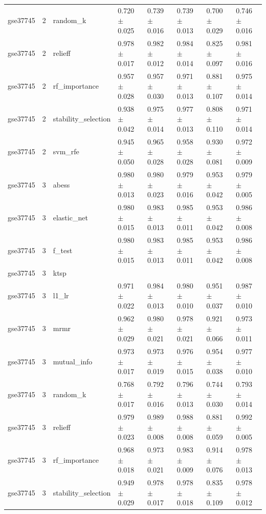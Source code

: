 \begin{table}[t]
\begin{tabular}{llllllll}
    gse37745 & 2 & random\_k & 0.720 $\pm$ 0.025 & 0.739 $\pm$ 0.016 & 0.739 $\pm$ 0.013 & 0.700 $\pm$ 0.029 & 0.746 $\pm$ 0.016 \\
    gse37745 & 2 & relieff & 0.978 $\pm$ 0.017 & 0.982 $\pm$ 0.012 & 0.984 $\pm$ 0.014 & 0.825 $\pm$ 0.097 & 0.981 $\pm$ 0.016 \\
    gse37745 & 2 & rf\_importance & 0.957 $\pm$ 0.028 & 0.957 $\pm$ 0.030 & 0.971 $\pm$ 0.013 & 0.881 $\pm$ 0.107 & 0.975 $\pm$ 0.014 \\
    gse37745 & 2 & stability\_selection & 0.938 $\pm$ 0.042 & 0.975 $\pm$ 0.014 & 0.977 $\pm$ 0.013 & 0.808 $\pm$ 0.110 & 0.971 $\pm$ 0.014 \\
    gse37745 & 2 & svm\_rfe & 0.945 $\pm$ 0.050 & 0.965 $\pm$ 0.028 & 0.958 $\pm$ 0.028 & 0.930 $\pm$ 0.081 & 0.972 $\pm$ 0.009 \\
    gse37745 & 3 & abess & 0.980 $\pm$ 0.013 & 0.980 $\pm$ 0.023 & 0.979 $\pm$ 0.016 & 0.953 $\pm$ 0.042 & 0.979 $\pm$ 0.005 \\
    gse37745 & 3 & elastic\_net & 0.980 $\pm$ 0.015 & 0.983 $\pm$ 0.013 & 0.985 $\pm$ 0.011 & 0.953 $\pm$ 0.042 & 0.986 $\pm$ 0.008 \\
    gse37745 & 3 & f\_test & 0.980 $\pm$ 0.015 & 0.983 $\pm$ 0.013 & 0.985 $\pm$ 0.011 & 0.953 $\pm$ 0.042 & 0.986 $\pm$ 0.008 \\
    gse37745 & 3 & ktsp &  &  &  &  &  \\
    gse37745 & 3 & l1\_lr & 0.971 $\pm$ 0.022 & 0.984 $\pm$ 0.013 & 0.980 $\pm$ 0.010 & 0.951 $\pm$ 0.037 & 0.987 $\pm$ 0.010 \\
    gse37745 & 3 & mrmr & 0.962 $\pm$ 0.029 & 0.980 $\pm$ 0.021 & 0.978 $\pm$ 0.021 & 0.921 $\pm$ 0.066 & 0.973 $\pm$ 0.011 \\
    gse37745 & 3 & mutual\_info & 0.973 $\pm$ 0.017 & 0.973 $\pm$ 0.019 & 0.976 $\pm$ 0.015 & 0.954 $\pm$ 0.038 & 0.977 $\pm$ 0.010 \\
    gse37745 & 3 & random\_k & 0.768 $\pm$ 0.017 & 0.792 $\pm$ 0.016 & 0.796 $\pm$ 0.013 & 0.744 $\pm$ 0.030 & 0.793 $\pm$ 0.014 \\
    gse37745 & 3 & relieff & 0.979 $\pm$ 0.023 & 0.989 $\pm$ 0.008 & 0.988 $\pm$ 0.008 & 0.881 $\pm$ 0.059 & 0.992 $\pm$ 0.005 \\
    gse37745 & 3 & rf\_importance & 0.968 $\pm$ 0.018 & 0.973 $\pm$ 0.021 & 0.983 $\pm$ 0.009 & 0.914 $\pm$ 0.076 & 0.978 $\pm$ 0.013 \\
    gse37745 & 3 & stability\_selection & 0.949 $\pm$ 0.029 & 0.978 $\pm$ 0.017 & 0.978 $\pm$ 0.018 & 0.835 $\pm$ 0.109 & 0.978 $\pm$ 0.012 \\

\end{tabular}
\end{table}
